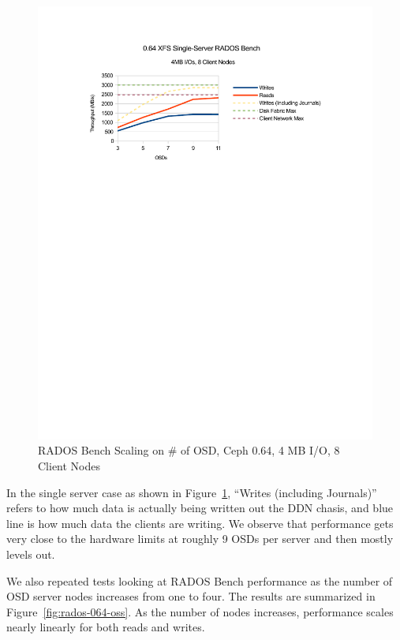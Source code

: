 \documentclass{article}
\begin{document}


\begin{figure}[htb]
\centering
\includegraphics[width=5in]{rados-064-osd}
\caption{RADOS Bench Scaling on \# of OSD, Ceph 0.64, 4 MB I/O, 8 Client Nodes}
\label{fig:rados-064-osd}
\end{figure}

In the single server case as shown in Figure~\ref{fig:rados-064-osd}, ``Writes
(including Journals)'' refers to how much data is actually being written out the
DDN chasis, and blue line is how much data the clients are writing.
We observe that performance gets very close to the hardware limits at roughly 9
OSDs per server and then mostly levels out.

We also repeated tests looking at RADOS Bench performance as the number of OSD
server nodes increases from one to four. The results are summarized in
Figure~\ref{fig:rados-064-oss}. As the number of nodes increases, performance
scales nearly linearly for both reads and writes.
\end{document}
